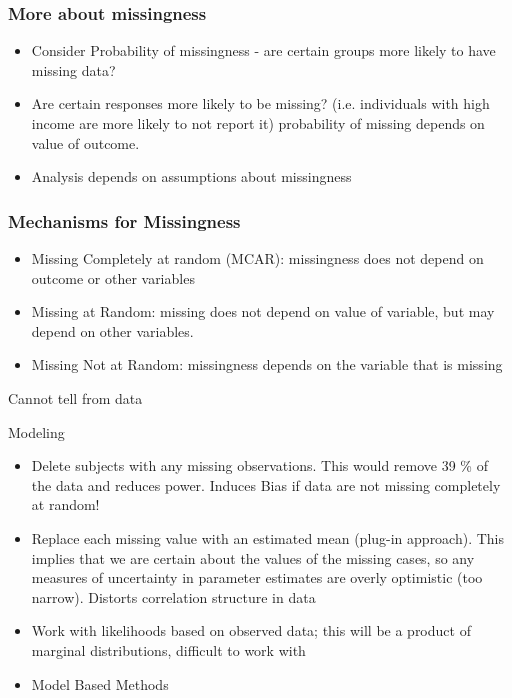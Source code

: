 \documentclass[]{beamer}\usepackage[]{graphicx}\usepackage[]{color}
\begin{document}
\begin{frame} \frametitle{More about missingness}
\begin{itemize}
\item Consider Probability of missingness - are certain groups more likely to have missing data? \pause
\item Are certain responses more likely to be missing?   (i.e. individuals with high income are more likely to not report it) probability of missing depends on value of outcome. \pause
\item Analysis depends on assumptions about missingness
\end{itemize}
\end{frame}

\begin{frame} \frametitle{Mechanisms for Missingness}
\begin{itemize}
\item Missing Completely at random  (MCAR): missingness does not depend on outcome or other variables   \pause
\item Missing at Random: missing does not depend on value of variable, but may depend on other variables.  \pause
\item Missing Not at Random:  missingness depends on the variable that is missing  \pause
\end{itemize}
Cannot tell from data
\end{frame}

\begin{frame}{Modeling}
  \begin{itemize}
  \item Delete subjects with any missing observations.  This would
  remove 39 \% of the data and reduces power.  Induces Bias if data are not missing completely at random!  \pause
  \item Replace each missing value with an estimated mean (plug-in approach).  This implies that we are certain about the values
  of the missing cases, so any measures of uncertainty in parameter
  estimates are overly optimistic (too narrow).  Distorts correlation structure in data  \pause
\item Work with likelihoods based on observed data; this will be a product
  of marginal distributions, difficult to work with \pause
  \item Model Based Methods
  \end{itemize}
\end{frame}
\end{document}

